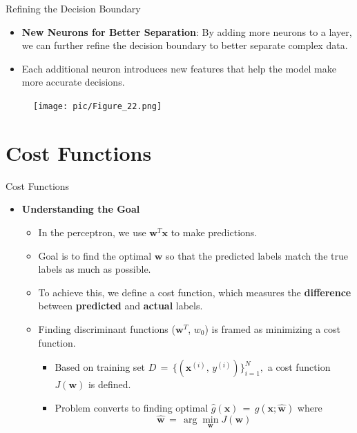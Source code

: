 \documentclass[serif, aspectratio=169]{beamer}
\begin{document}
    \begin{frame}{Refining the Decision Boundary}
        \begin{itemize}
            \item \justifying \textbf{New Neurons for Better Separation}:
            By adding more neurons to a layer, we can further refine the decision boundary to better separate complex data.
            \item \justifying Each additional neuron introduces new features that help the model make more accurate decisions.
        \end{itemize}
        \begin{figure}
            \centering
            \texttt{[image: pic/Figure\_22.png]}
        \end{figure}
        \vfill
    \end{frame}


    \section{Cost Functions}


    \begin{frame}{Cost Functions}
        \begin{itemize}
            \item \textbf{Understanding the Goal}
            \medskip
            \begin{itemize}\itemsep1em
            \item In the perceptron, we use \( \mathbf{w}^T \mathbf{x} \) to make predictions.
            \item Goal is to find the optimal \(\mathbf{w}\) so that the predicted labels match the true labels as much as possible.
            \item To achieve this, we define a cost function, which measures the \textbf{difference} between \textbf{predicted} and \textbf{actual} labels.
            \item Finding discriminant functions (\(\mathbf{w}^T\), \(w_0\)) is framed as minimizing a cost function.
            \smallskip
            \begin{itemize}\itemsep0.8em
            \item Based on training set \(D \, = \, \{(\mathbf{x}^{(i)},\, y^{(i)})\}^N_{i=1},\) a cost function \(J(\mathbf{w})\) is defined.
            \item Problem converts to finding optimal \(\hat{g}(\mathbf{x}) \, = \, g(\mathbf{x; \hat{w}})\) where \[\mathbf{\hat{w}} \, = \, \arg \min_{\mathbf{w}}J(\mathbf{w})\]
            \end{itemize}
            \end{itemize}
        \end{itemize}
    \end{frame}
\end{document}
